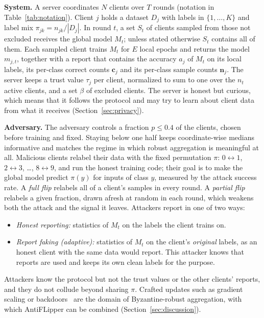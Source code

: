 \documentclass[journal]{IEEEtran}
\begin{document}
\textbf{System.} A server coordinates $N$ clients over $T$ rounds (notation in Table~\ref{tab:notation}). Client $j$ holds a dataset $D_j$ with labels in $\{1,\dots,K\}$ and label mix $\pi_{jk}=n_{jk}/|D_j|$. In round $t$, a set $S_t$ of clients sampled from those not excluded receives the global model $M_t$; unless stated otherwise $S_t$ contains all of them. Each sampled client trains $M_t$ for $E$ local epochs and returns the model $m_{j,t}$, together with a report that contains the accuracy $a_j$ of $M_t$ on its local labels, its per-class correct counts $\mathbf{c}_j$ and its per-class sample counts $\mathbf{n}_j$. The server keeps a trust value $\tau_j$ per client, normalized to sum to one over the $n_t$ active clients, and a set $\beta$ of excluded clients. The server is honest but curious, which means that it follows the protocol and may try to learn about client data from what it receives (Section~\ref{sec:privacy}).

\textbf{Adversary.} The adversary controls a fraction $p\le 0.4$ of the clients, chosen before training and fixed. Staying below one half keeps coordinate-wise medians informative and matches the regime in which robust aggregation is meaningful at all. Malicious clients relabel their data with the fixed permutation $\pi$: $0{\leftrightarrow}1$, $2{\leftrightarrow}3$, \dots, $8{\leftrightarrow}9$, and run the honest training code; their goal is to make the global model predict $\pi(y)$ for inputs of class $y$, measured by the attack success rate. A \emph{full flip} relabels all of a client's samples in every round. A \emph{partial flip} relabels a given fraction, drawn afresh at random in each round, which weakens both the attack and the signal it leaves. Attackers report in one of two ways:
\begin{itemize}
\item \emph{Honest reporting:} statistics of $M_t$ on the labels the client trains on.
\item \emph{Report faking (adaptive):} statistics of $M_t$ on the client's \emph{original} labels, as an honest client with the same data would report. This attacker knows that reports are used and keeps its own clean labels for the purpose.
\end{itemize}
Attackers know the protocol but not the trust values or the other clients' reports, and they do not collude beyond sharing $\pi$. Crafted updates such as gradient scaling or backdoors~\cite{bagdasaryan2020backdoor,fang2020local} are the domain of Byzantine-robust aggregation, with which AntiFLipper can be combined (Section~\ref{sec:discussion}).
\end{document}
